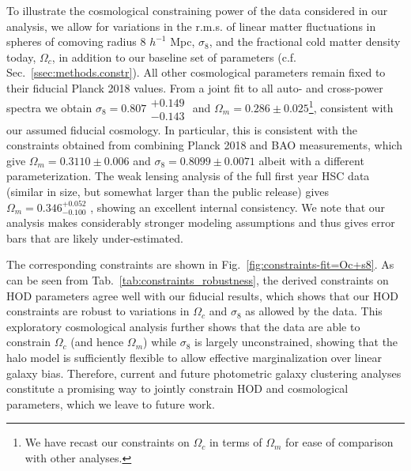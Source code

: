 \documentclass[a4paper,11pt]{article}
\begin{document}
    To illustrate the cosmological constraining power of the data considered in our analysis, we allow for variations in the r.m.s. of linear matter fluctuations in spheres of comoving radius 8 $h^{-1}$ Mpc, $\sigma_{8}$, and the fractional cold matter density today, $\Omega_{c}$, in addition to our baseline set of parameters (c.f. Sec.~\ref{ssec:methods.constr}). All other cosmological parameters remain fixed to their fiducial Planck 2018 values. From a joint fit to all auto- and cross-power spectra we obtain $\sigma_{8} = 0.807\substack{+0.149 \\ -0.143}$ and $\Omega_{m} = 0.286 \pm 0.025$\footnote{We have recast our constraints on $\Omega_{c}$ in terms of $\Omega_{m}$ for ease of comparison with other analyses.},
    consistent with our assumed fiducial cosmology.  In particular, this is consistent with the constraints obtained from combining Planck 2018 and BAO measurements, which give $\Omega_m=0.3110\pm 0.006$ and $\sigma_8=0.8099 \pm 0.0071$ \cite{Planck:2018} albeit with a different parameterization. The weak lensing analysis of the full first year HSC data (similar in size, but somewhat larger than the public release) gives $\Omega_m=0.346^{+0.052}_{-0.100}$ \cite{1906.06041}, showing an excellent internal consistency. We note that our analysis makes considerably stronger modeling assumptions and thus gives error bars that are likely under-estimated.

    The corresponding constraints are shown in Fig.~\ref{fig:constraints-fit=Oc+s8}. As can be seen from Tab.~\ref{tab:constraints_robustness}, the derived constraints on HOD parameters agree well with our fiducial results, which shows that our HOD constraints are robust to variations in $\Omega_{c}$ and $\sigma_{8}$ as allowed by the data. This exploratory cosmological analysis further shows that the data are able to constrain $\Omega_{c}$ (and hence $\Omega_{m}$) while $\sigma_{8}$ is largely unconstrained, showing that the halo model is sufficiently flexible to allow effective marginalization over linear galaxy bias. Therefore, current and future photometric galaxy clustering analyses constitute a promising way to jointly constrain HOD and cosmological parameters, which we leave to future work. 
 
\end{document}
